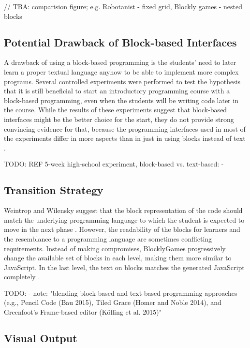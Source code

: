 // TBA: comparision figure; e.g. Robotanist - fixed grid, Blockly games - nested blocks


\subsection{Potential Drawback of Block-based Interfaces}
\label{sec:potential-drawback-of-block-based-interfaces}
A drawback of using a block-based programming
  is the students' need to later learn a proper textual language anyhow
  to be able to implement more complex programs.
Several controlled experiments were performed to test the hypothesis
  that it is still beneficial to start an introductory programming course
  with a block-based programming,
  even when the students will be writing code later in the course.
While the results of these experiments suggest that block-based interfaces
  might be the better choice for the start,
  they do not provide strong convincing evidence for that,
  because the programming interfaces used in most of the experiments differ in more aspects
  than in just in using blocks instead of text
  \cite{comparing-blocks-text-price2015}.

TODO: REF 5-week high-school experiment, block-based vs. text-based:
- \cite{comparing-blocks-text-weintrop2017}

\subsection{Transition Strategy}
\label{sec:transition-strategy}
Weintrop and Wilensky suggest that the block representation of the code
  should match the underlying programming language
  to which the student is expected to move in the next phase
  \cite{challenges-of-blocks-based-environments}.
However, the readability of the blocks for learners
  and the resemblance to a programming language
  are sometimes conflicting requirements.
Instead of making compromises,
  BlocklyGames progressively change the available set of blocks in each level,
  making them more similar to JavaScript.
In the last level,
  the text on blocks matches the generated JavaScript completely
  \cite{blockly-10-things}.

TODO:
- note: "blending block-based and text-based programming approaches (e.g., Pencil Code
(Bau 2015), Tiled Grace (Homer and Noble 2014), and Greenfoot’s Frame-based editor (Kölling et al.
2015)"


\subsection{Visual Output}
\label{sec:visual-output}


